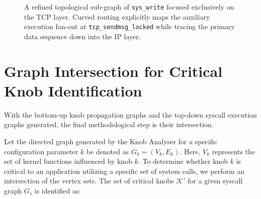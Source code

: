 \begin{figure}[ht]
{
    }
    \caption{A refined topological sub-graph of \texttt{sys\_write} focused exclusively on the TCP layer. Curved routing explicitly maps the auxiliary execution fan-out at \texttt{tcp\_sendmsg\_locked} while tracing the primary data sequence down into the IP layer.}
    \label{fig:sys_write_subgraph}
\end{figure}

\section{Graph Intersection for Critical Knob Identification}

With the bottom-up knob propagation graphs and the top-down syscall execution graphs generated, the final methodological step is their intersection.

Let the directed graph generated by the Knob Analyser for a specific configuration parameter $k$ be denoted as \(G_k = (V_k,E_k)\).
Here, \(V_k\) represents the set of kernel functions influenced by knob $k$.
To determine whether knob $k$ is critical to an application utilizing a specific set of system calls, we perform an intersection of the vertex sets.
The set of critical knobs $\mathcal{K}'$ for a given syscall graph $G_s$ is identified as:

